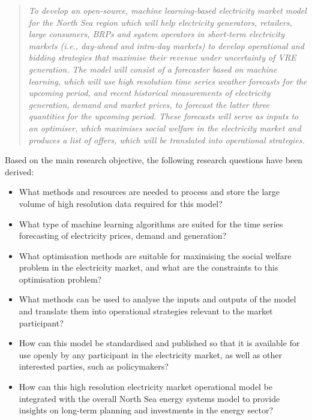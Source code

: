\begin{quote}
\emph{To develop an open-source, machine learning-based electricity
market model for the North Sea region which will help electricity
generators, retailers, large consumers, BRPs and system operators in
short-term electricity markets (i.e., day-ahead and intra-day markets)
to develop operational and bidding strategies that maximise their
revenue under uncertainty of VRE generation. The model will consist of a
forecaster based on machine learning, which will use high resolution
time series weather forecasts for the upcoming period, and recent
historical measurements of electricity generation, demand and market
prices, to forecast the latter three quantities for the upcoming period.
These forecasts will serve as inputs to an optimiser, which maximises
social welfare in the electricity market and produces a list of offers,
which will be translated into operational strategies.}
\end{quote}

Based on the main research objective, the following research questions
have been derived:

\begin{itemize}
\tightlist
\item
  What methods and resources are needed to process and store the large
  volume of high resolution data required for this model?
\item
  What type of machine learning algorithms are suited for the time
  series forecasting of electricity prices, demand and generation?
\item
  What optimisation methods are suitable for maximising the social
  welfare problem in the electricity market, and what are the
  constraints to this optimisation problem?
\item
  What methods can be used to analyse the inputs and outputs of the
  model and translate them into operational strategies relevant to the
  market participant?
\item
  How can this model be standardised and published so that it is
  available for use openly by any participant in the electricity market,
  as well as other interested parties, such as policymakers?
\item
  How can this high resolution electricity market operational model be
  integrated with the overall North Sea energy systems model to provide
  insights on long-term planning and investments in the energy sector?
\end{itemize}

